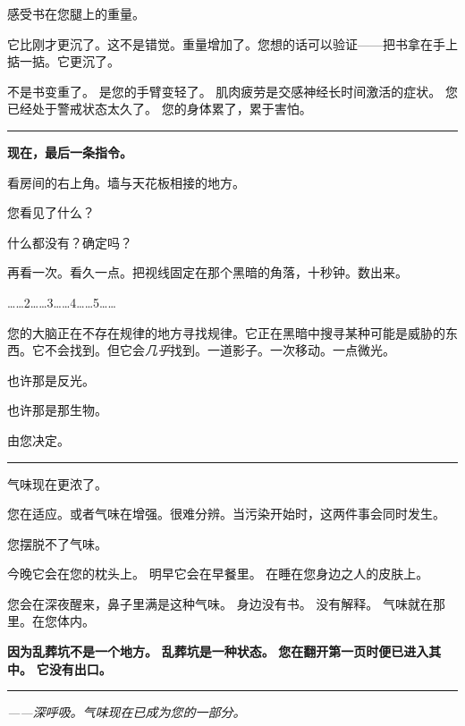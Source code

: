 \noindent 感受书在您腿上的重量。

\noindent 它比刚才更沉了。这不是错觉。重量增加了。您想的话可以验证——把书拿在手上掂一掂。它更沉了。

\noindent 不是书变重了。
是您的手臂变轻了。
肌肉疲劳是交感神经长时间激活的症状。
您已经处于警戒状态太久了。
您的身体累了，累于害怕。

\vspace{0.5em}\noindent\rule{\textwidth}{0.5pt}\vspace{0.5em}

\noindent \textbf{现在，最后一条指令。}

\noindent 看房间的右上角。墙与天花板相接的地方。

\noindent 您看见了什么？

\noindent 什么都没有？确定吗？

\noindent 再看一次。看久一点。把视线固定在那个黑暗的角落，十秒钟。数出来。

……2……3……4……5……

\noindent 您的大脑正在不存在规律的地方寻找规律。它正在黑暗中搜寻某种可能是威胁的东西。它不会找到。但它会\textit{几乎}找到。一道影子。一次移动。一点微光。

\noindent 也许那是反光。

\noindent 也许那是那生物。

\noindent 由您决定。

\vspace{0.5em}\noindent\rule{\textwidth}{0.5pt}\vspace{0.5em}

\noindent 气味现在更浓了。

\noindent 您在适应。或者气味在增强。很难分辨。当污染开始时，这两件事会同时发生。

\noindent 您摆脱不了气味。

\noindent 今晚它会在您的枕头上。
\noindent 明早它会在早餐里。
\noindent 在睡在您身边之人的皮肤上。

\noindent 您会在深夜醒来，鼻子里满是这种气味。
\noindent 身边没有书。
\noindent 没有解释。
\noindent 气味就在那里。在您体内。

\noindent \textbf{因为乱葬坑不是一个地方。}
\noindent \textbf{乱葬坑是一种状态。}
\noindent \textbf{您在翻开第一页时便已进入其中。}
\noindent \textbf{它没有出口。}

\vspace{0.5em}\noindent\rule{\textwidth}{0.5pt}\vspace{0.5em}

\noindent \textit{——深呼吸。气味现在已成为您的一部分。}


